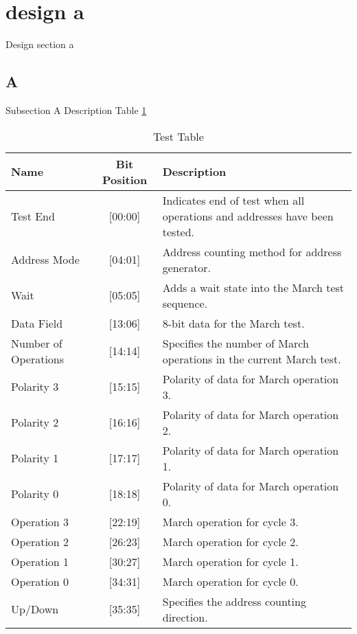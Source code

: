 \section{design a}
\label{sect:design-a}
Design section a

\subsection{A}
Subsection A Description  Table \ref{tab:instreg} 

\begin{table}[H]
  \caption{Test Table}
  \centering
  \begin{tabular}{|p{1in}|c|p{3in}|}
  \hline
  Name & Bit Position & Description \\
  \hline\hline
  Test End & [00:00] & Indicates end of test when all operations and addresses have been tested. \\ \hline
  Address Mode & [04:01] & Address counting method for address generator. \\ \hline
  Wait & [05:05] & Adds a wait state into the March test sequence. \\ \hline
  Data Field & [13:06] & 8-bit data for the March test. \\ \hline
  Number of Operations & [14:14] & Specifies the number of March operations in the current March test. \\ \hline
  Polarity 3 & [15:15] & Polarity of data for March operation 3. \\ \hline
  Polarity 2 & [16:16] & Polarity of data for March operation 2. \\ \hline
  Polarity 1 & [17:17] & Polarity of data for March operation 1. \\ \hline
  Polarity 0 & [18:18] & Polarity of data for March operation 0. \\ \hline
  Operation 3 & [22:19] & March operation for cycle 3. \\ \hline
  Operation 2 & [26:23] & March operation for cycle 2. \\ \hline
  Operation 1 & [30:27] & March operation for cycle 1. \\ \hline
  Operation 0 & [34:31] & March operation for cycle 0. \\ \hline
  Up/Down & [35:35] & Specifies the address counting direction. \\ \hline
  \end{tabular}
  \label{tab:instreg}
\end{table}

